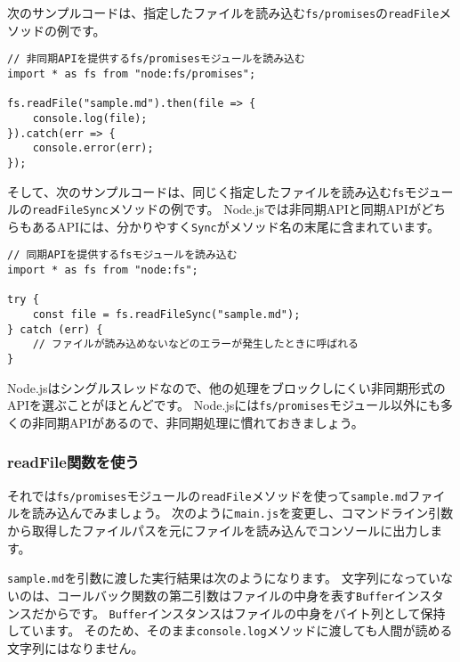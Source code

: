 次のサンプルコードは、指定したファイルを読み込む\texttt{fs/promises}の\texttt{readFile}メソッドの例です。

\begin{lstlisting}
// 非同期APIを提供するfs/promisesモジュールを読み込む
import * as fs from "node:fs/promises";

fs.readFile("sample.md").then(file => {
    console.log(file);
}).catch(err => {
    console.error(err);
});
\end{lstlisting}

そして、次のサンプルコードは、同じく指定したファイルを読み込む\texttt{fs}モジュールの\texttt{readFileSync}メソッドの例です。
Node.jsでは非同期APIと同期APIがどちらもあるAPIには、分かりやすく\texttt{Sync}がメソッド名の末尾に含まれています。

\begin{lstlisting}
// 同期APIを提供するfsモジュールを読み込む
import * as fs from "node:fs";

try {
    const file = fs.readFileSync("sample.md");
} catch (err) {
    // ファイルが読み込めないなどのエラーが発生したときに呼ばれる
}
\end{lstlisting}

Node.jsはシングルスレッドなので、他の処理をブロックしにくい非同期形式のAPIを選ぶことがほとんどです。
Node.jsには\texttt{fs/promises}モジュール以外にも多くの非同期APIがあるので、非同期処理に慣れておきましょう。

\hypertarget{use-readFile}{%
\subsubsection{readFile関数を使う}\label{use-readFile}}

それでは\texttt{fs/promises}モジュールの\texttt{readFile}メソッドを使って\texttt{sample.md}ファイルを読み込んでみましょう。
次のように\texttt{main.js}を変更し、コマンドライン引数から取得したファイルパスを元にファイルを読み込んでコンソールに出力します。



\texttt{sample.md}を引数に渡した実行結果は次のようになります。
文字列になっていないのは、コールバック関数の第二引数はファイルの中身を表す\texttt{Buffer}インスタンスだからです。
\texttt{Buffer}インスタンスはファイルの中身をバイト列として保持しています。
そのため、そのまま\texttt{console.log}メソッドに渡しても人間が読める文字列にはなりません。

